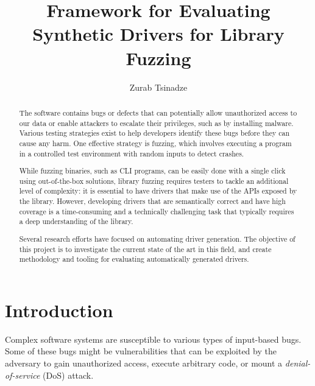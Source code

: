 \documentclass[a4paper,11pt,oneside]{report}
\title{Framework for Evaluating Synthetic Drivers for Library Fuzzing}
\author{Zurab Tsinadze}
\begin{document}
\maketitle

\begin{abstract}

The software contains bugs or defects that can potentially allow unauthorized
access to our data or enable attackers to escalate their privileges, such as
by installing malware. Various testing strategies exist to help developers
identify these bugs before they can cause any harm. One effective strategy is
fuzzing, which involves executing a program in a controlled test environment
with random inputs to detect crashes.

While fuzzing binaries, such as CLI programs, can be easily done with a
single click using out-of-the-box solutions, library fuzzing requires testers
to tackle an additional level of complexity: it is essential to have drivers
that make use of the APIs exposed by the library. However, developing drivers
that are semantically correct and have high coverage is a time-consuming and
a technically challenging task that typically requires a deep understanding 
of the library.

Several research efforts have focused on automating driver generation. The 
objective of this project is to investigate the current state of the art in
this field, and create methodology and tooling for evaluating automatically
generated drivers.

\end{abstract}


\maketoc


\chapter{Introduction}
Complex software systems are susceptible to various types of input-based bugs.
Some of these bugs might be vulnerabilities that can be exploited by the 
adversary to gain unauthorized access, execute arbitrary code, or mount
a \emph{denial-of-service} (DoS) attack. 
\end{document}
